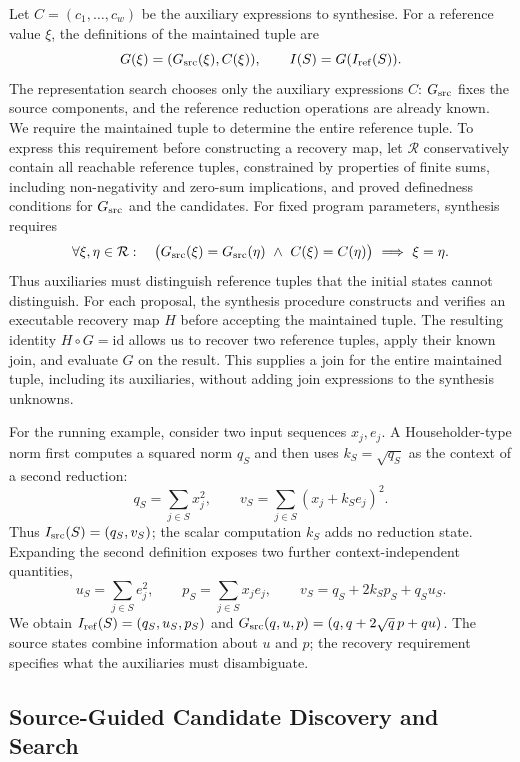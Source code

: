 Let $C=(c_1,\ldots,c_w)$ be the auxiliary expressions to synthesise.
For a reference value $\xi$, the definitions of the maintained tuple are
\[
G(\xi)=(G_{\mathrm{src}}(\xi),C(\xi)),\qquad
I(S)=G(I_{\mathrm{ref}}(S)).
\]
The representation search chooses only the auxiliary expressions $C$: $G_{\mathrm{src}}$ fixes the source components, and the reference reduction operations are already known.
We require the maintained tuple to determine the entire reference tuple.
To express this requirement before constructing a recovery map, let $\mathcal R$ conservatively contain all reachable reference tuples, constrained by properties of finite sums, including non-negativity and zero-sum implications, and proved definedness conditions for $G_{\mathrm{src}}$ and the candidates.
For fixed program parameters, synthesis requires
\begin{equation}
\label{eq:synthesis}
\forall \xi,\eta\in\mathcal R:\quad
\bigl(G_{\mathrm{src}}(\xi)=G_{\mathrm{src}}(\eta)\ \land\ C(\xi)=C(\eta)\bigr)
\ \Longrightarrow\ \xi=\eta.
\end{equation}
Thus auxiliaries must distinguish reference tuples that the initial states cannot distinguish.
For each proposal, the synthesis procedure constructs and verifies an executable recovery map $H$ before accepting the maintained tuple.
The resulting identity $H\circ G=\mathrm{id}$ allows us to recover two reference tuples, apply their known join, and evaluate $G$ on the result.
This supplies a join for the entire maintained tuple, including its auxiliaries, without adding join expressions to the synthesis unknowns.

For the running example, consider two input sequences $x_j,e_j$.
A Householder-type norm first computes a squared norm $q_S$ and then uses $k_S=\sqrt{q_S}$ as the context of a second reduction:
\[
q_S=\sum_{j\in S}x_j^2,\qquad
v_S=\sum_{j\in S}(x_j+k_Se_j)^2.
\]
Thus $I_{\mathrm{src}}(S)=(q_S,v_S)$; the scalar computation $k_S$ adds no reduction state.
Expanding the second definition exposes two further context-independent quantities,
\[
u_S=\sum_{j\in S}e_j^2,\qquad
p_S=\sum_{j\in S}x_je_j,\qquad
v_S=q_S+2k_Sp_S+q_Su_S.
\]
We obtain $I_{\mathrm{ref}}(S)=(q_S,u_S,p_S)$ and
$G_{\mathrm{src}}(q,u,p)=(q,q+2\sqrt q\,p+qu)$.
The source states combine information about $u$ and $p$; the recovery requirement specifies what the auxiliaries must disambiguate.

\subsection{Source-Guided Candidate Discovery and Search}
\label{sec:synthesis}

